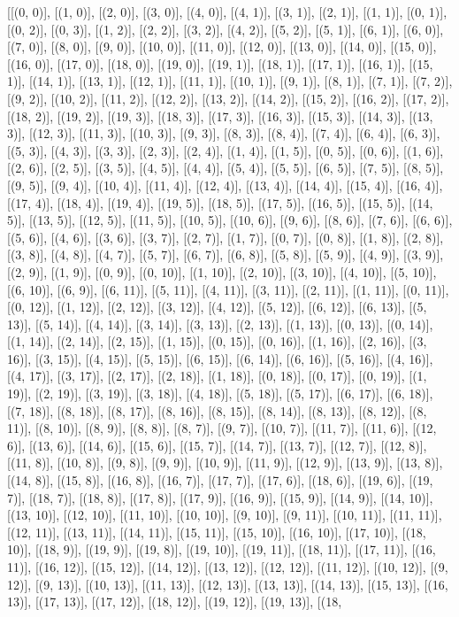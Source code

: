 [[(0, 0)], [(1, 0)], [(2, 0)], [(3, 0)], [(4, 0)], [(4, 1)], [(3, 1)], [(2, 1)], [(1, 1)], [(0, 1)], [(0, 2)], [(0, 3)], [(1, 2)], [(2, 2)], [(3, 2)], [(4, 2)], [(5, 2)], [(5, 1)], [(6, 1)], [(6, 0)], [(7, 0)], [(8, 0)], [(9, 0)], [(10, 0)], [(11, 0)], [(12, 0)], [(13, 0)], [(14, 0)], [(15, 0)], [(16, 0)], [(17, 0)], [(18, 0)], [(19, 0)], [(19, 1)], [(18, 1)], [(17, 1)], [(16, 1)], [(15, 1)], [(14, 1)], [(13, 1)], [(12, 1)], [(11, 1)], [(10, 1)], [(9, 1)], [(8, 1)], [(7, 1)], [(7, 2)], [(9, 2)], [(10, 2)], [(11, 2)], [(12, 2)], [(13, 2)], [(14, 2)], [(15, 2)], [(16, 2)], [(17, 2)], [(18, 2)], [(19, 2)], [(19, 3)], [(18, 3)], [(17, 3)], [(16, 3)], [(15, 3)], [(14, 3)], [(13, 3)], [(12, 3)], [(11, 3)], [(10, 3)], [(9, 3)], [(8, 3)], [(8, 4)], [(7, 4)], [(6, 4)], [(6, 3)], [(5, 3)], [(4, 3)], [(3, 3)], [(2, 3)], [(2, 4)], [(1, 4)], [(1, 5)], [(0, 5)], [(0, 6)], [(1, 6)], [(2, 6)], [(2, 5)], [(3, 5)], [(4, 5)], [(4, 4)], [(5, 4)], [(5, 5)], [(6, 5)], [(7, 5)], [(8, 5)], [(9, 5)], [(9, 4)], [(10, 4)], [(11, 4)], [(12, 4)], [(13, 4)], [(14, 4)], [(15, 4)], [(16, 4)], [(17, 4)], [(18, 4)], [(19, 4)], [(19, 5)], [(18, 5)], [(17, 5)], [(16, 5)], [(15, 5)], [(14, 5)], [(13, 5)], [(12, 5)], [(11, 5)], [(10, 5)], [(10, 6)], [(9, 6)], [(8, 6)], [(7, 6)], [(6, 6)], [(5, 6)], [(4, 6)], [(3, 6)], [(3, 7)], [(2, 7)], [(1, 7)], [(0, 7)], [(0, 8)], [(1, 8)], [(2, 8)], [(3, 8)], [(4, 8)], [(4, 7)], [(5, 7)], [(6, 7)], [(6, 8)], [(5, 8)], [(5, 9)], [(4, 9)], [(3, 9)], [(2, 9)], [(1, 9)], [(0, 9)], [(0, 10)], [(1, 10)], [(2, 10)], [(3, 10)], [(4, 10)], [(5, 10)], [(6, 10)], [(6, 9)], [(6, 11)], [(5, 11)], [(4, 11)], [(3, 11)], [(2, 11)], [(1, 11)], [(0, 11)], [(0, 12)], [(1, 12)], [(2, 12)], [(3, 12)], [(4, 12)], [(5, 12)], [(6, 12)], [(6, 13)], [(5, 13)], [(5, 14)], [(4, 14)], [(3, 14)], [(3, 13)], [(2, 13)], [(1, 13)], [(0, 13)], [(0, 14)], [(1, 14)], [(2, 14)], [(2, 15)], [(1, 15)], [(0, 15)], [(0, 16)], [(1, 16)], [(2, 16)], [(3, 16)], [(3, 15)], [(4, 15)], [(5, 15)], [(6, 15)], [(6, 14)], [(6, 16)], [(5, 16)], [(4, 16)], [(4, 17)], [(3, 17)], [(2, 17)], [(2, 18)], [(1, 18)], [(0, 18)], [(0, 17)], [(0, 19)], [(1, 19)], [(2, 19)], [(3, 19)], [(3, 18)], [(4, 18)], [(5, 18)], [(5, 17)], [(6, 17)], [(6, 18)], [(7, 18)], [(8, 18)], [(8, 17)], [(8, 16)], [(8, 15)], [(8, 14)], [(8, 13)], [(8, 12)], [(8, 11)], [(8, 10)], [(8, 9)], [(8, 8)], [(8, 7)], [(9, 7)], [(10, 7)], [(11, 7)], [(11, 6)], [(12, 6)], [(13, 6)], [(14, 6)], [(15, 6)], [(15, 7)], [(14, 7)], [(13, 7)], [(12, 7)], [(12, 8)], [(11, 8)], [(10, 8)], [(9, 8)], [(9, 9)], [(10, 9)], [(11, 9)], [(12, 9)], [(13, 9)], [(13, 8)], [(14, 8)], [(15, 8)], [(16, 8)], [(16, 7)], [(17, 7)], [(17, 6)], [(18, 6)], [(19, 6)], [(19, 7)], [(18, 7)], [(18, 8)], [(17, 8)], [(17, 9)], [(16, 9)], [(15, 9)], [(14, 9)], [(14, 10)], [(13, 10)], [(12, 10)], [(11, 10)], [(10, 10)], [(9, 10)], [(9, 11)], [(10, 11)], [(11, 11)], [(12, 11)], [(13, 11)], [(14, 11)], [(15, 11)], [(15, 10)], [(16, 10)], [(17, 10)], [(18, 10)], [(18, 9)], [(19, 9)], [(19, 8)], [(19, 10)], [(19, 11)], [(18, 11)], [(17, 11)], [(16, 11)], [(16, 12)], [(15, 12)], [(14, 12)], [(13, 12)], [(12, 12)], [(11, 12)], [(10, 12)], [(9, 12)], [(9, 13)], [(10, 13)], [(11, 13)], [(12, 13)], [(13, 13)], [(14, 13)], [(15, 13)], [(16, 13)], [(17, 13)], [(17, 12)], [(18, 12)], [(19, 12)], [(19, 13)], [(18, 